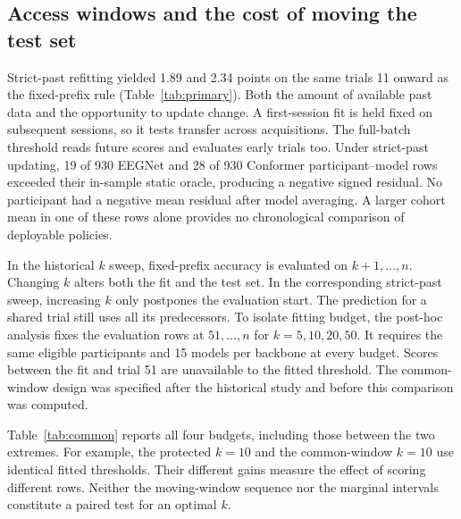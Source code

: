 \begin{table}[!t]
\caption{Changing fitting budget and evaluation start. Historical moving-suffix columns show mean BA gains in points. The post-hoc common suffix includes marginal 95\% descriptive intervals, using the same 10,000 participant draws across budgets. Each pair lists EEGNet then Conformer.}\label{tab:common}
\centering\small\end{table}

\subsection{Access windows and the cost of moving the test set}
Strict-past refitting yielded 1.89 and 2.34 points on the same trials 11 onward as the fixed-prefix rule (Table~\ref{tab:primary}). Both the amount of available past data and the opportunity to update change. A first-session fit is held fixed on subsequent sessions, so it tests transfer across acquisitions. The full-batch threshold reads future scores and evaluates early trials too. Under strict-past updating, 19 of 930 EEGNet and 28 of 930 Conformer participant--model rows exceeded their in-sample static oracle, producing a negative signed residual. No participant had a negative mean residual after model averaging. A larger cohort mean in one of these rows alone provides no chronological comparison of deployable policies.

In the historical $k$ sweep, fixed-prefix accuracy is evaluated on $k+1,\ldots,n$. Changing $k$ alters both the fit and the test set. In the corresponding strict-past sweep, increasing $k$ only postpones the evaluation start. The prediction for a shared trial still uses all its predecessors. To isolate fitting budget, the post-hoc analysis fixes the evaluation rows at $51,\ldots,n$ for $k=5,10,20,50$. It requires the same eligible participants and 15 models per backbone at every budget. Scores between the fit and trial 51 are unavailable to the fitted threshold. The common-window design was specified after the historical study and before this comparison was computed.


Table~\ref{tab:common} reports all four budgets, including those between the two extremes. For example, the protected $k=10$ and the common-window $k=10$ use identical fitted thresholds. Their different gains measure the effect of scoring different rows. Neither the moving-window sequence nor the marginal intervals constitute a paired test for an optimal $k$.

